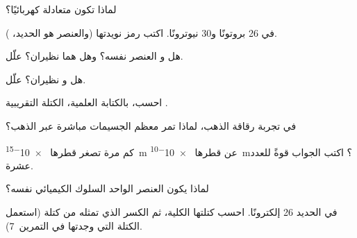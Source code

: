 \begin{exercise}[$\star$]\label{exo:g9:inside-the-atom:3}
لماذا تكون  متعادلة كهربائيًا؟
\end{exercise}

\begin{exercise}[$\star$]\label{exo:g9:inside-the-atom:4}
في  26 بروتونًا و30 نيوترونًا. اكتب رمز نويدتها (والعنصر هو الحديد،
).
\end{exercise}

\begin{exercise}[$\star\star$]\label{exo:g9:inside-the-atom:5}
هل  و العنصر نفسه؟ وهل هما
نظيران؟ علّل.
\end{exercise}

\begin{exercise}[$\star\star$]\label{exo:g9:inside-the-atom:6}
هل  و نظيران؟ علّل.
\end{exercise}

\begin{exercise}[$\star\star$]\label{exo:g9:inside-the-atom:7}
احسب، بالكتابة العلمية، الكتلة التقريبية 
.
\end{exercise}

\begin{exercise}[$\star\star$]\label{exo:g9:inside-the-atom:8}
في تجربة رقاقة الذهب، لماذا تمر معظم الجسيمات مباشرة عبر
الذهب؟
\end{exercise}

\begin{exercise}[$\star\star$]\label{exo:g9:inside-the-atom:9}
كم مرة تصغر  قطرها \qty{e-15}{m} عن  قطرها
\qty{e-10}{m}؟ اكتب الجواب قوةً للعدد عشرة.
\end{exercise}

\begin{exercise}[$\star\star$]\label{exo:g9:inside-the-atom:10}
لماذا يكون  العنصر الواحد السلوك الكيميائي نفسه؟
\end{exercise}

\begin{exercise}[$\star\star\star$]\label{exo:g9:inside-the-atom:11}
في  الحديد 26 إلكترونًا. احسب كتلتها الكلية، ثم الكسر الذي تمثله من
كتلة   (استعمل الكتلة التي وجدتها في
التمرين~7).
\end{exercise}


